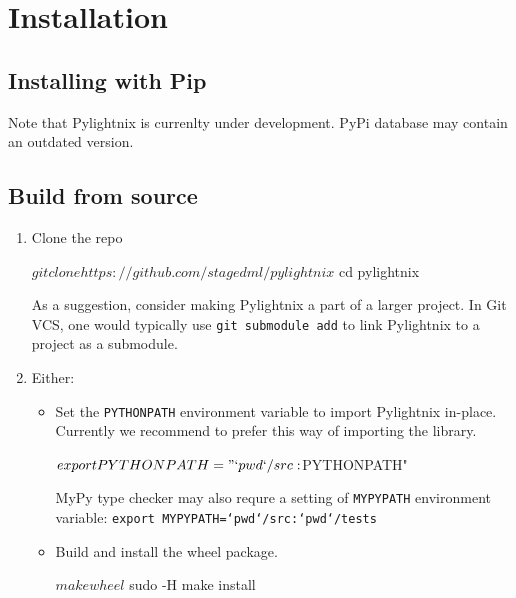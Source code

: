 \section{Installation}

\subsection{Installing with Pip}


Note that Pylightnix is currenlty under development. PyPi database may contain
an outdated version.

\subsection{Build from source}

\begin{enumerate}
  \item Clone the repo

    \begin{shellcode}
    $ git clone https://github.com/stagedml/pylightnix
    $ cd pylightnix
    \end{shellcode}

    As a suggestion, consider making Pylightnix a part of a larger project.
    In Git VCS, one would typically use \texttt{git submodule add} to link
    Pylightnix to a project as a submodule.

  \item Either:
    \begin{itemize}

      \item Set the \texttt{PYTHONPATH} environment variable to import
        Pylightnix in-place. Currently we recommend to prefer this way of
        importing the library.

        \begin{shellcode}
        $ export PYTHONPATH="`pwd`/src:$PYTHONPATH"
        \end{shellcode}

        MyPy type checker may also requre a setting of \texttt{MYPYPATH}
        environment variable: \texttt{export MYPYPATH=`pwd`/src:`pwd`/tests}

      \item Build and install the wheel package.
        \begin{shellcode}
        $ make wheel
        $ sudo -H make install
        \end{shellcode}

    \end{itemize}
\end{enumerate}

